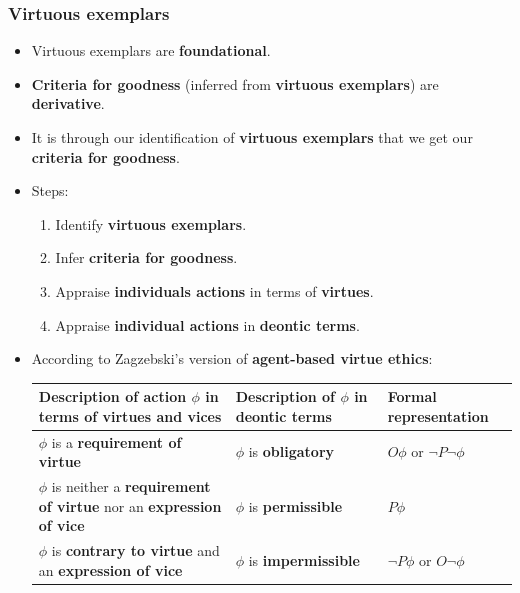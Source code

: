 \documentclass[11pt]{article}
\begin{document}
\subsubsection{Virtuous exemplars}
\label{sec:org2e3f2c7}
\begin{itemize}
\item Virtuous exemplars are \textbf{foundational}.
\item \textbf{Criteria for goodness} (inferred from \textbf{virtuous exemplars}) are \textbf{derivative}.
\item It is through our identification of \textbf{virtuous exemplars} that we get our \textbf{criteria for goodness}.
\item Steps:
\begin{enumerate}
\item Identify \textbf{virtuous exemplars}.
\item Infer \textbf{criteria for goodness}.
\item Appraise \textbf{individuals actions} in terms of \textbf{virtues}.
\item Appraise \textbf{individual actions} in \textbf{deontic terms}.
\end{enumerate}
\item According to Zagzebski's version of \textbf{agent-based virtue ethics}:

\begin{center}
\begin{tabularx}{\textwidth}{|X|X|X|}
\hline
Description of action \(\phi\) in terms of virtues and vices & Description of \(\phi\) in deontic terms & Formal representation\\
\hline
\(\phi\) is a \textbf{requirement of virtue} & \(\phi\) is \textbf{obligatory} & \(O \phi\) or \(\neg P \neg \phi\)\\
\hline
\(\phi\) is neither a \textbf{requirement of virtue} nor an \textbf{expression of vice} & \(\phi\) is \textbf{permissible} & \(P \phi\)\\
\hline
\(\phi\) is \textbf{contrary to virtue} and an \textbf{expression of vice} & \(\phi\) is \textbf{impermissible} & \(\neg P \phi\) or \(O \neg \phi\)\\
\hline
\end{tabularx}
\end{center}
\end{itemize}

 \newpage
\end{document}
